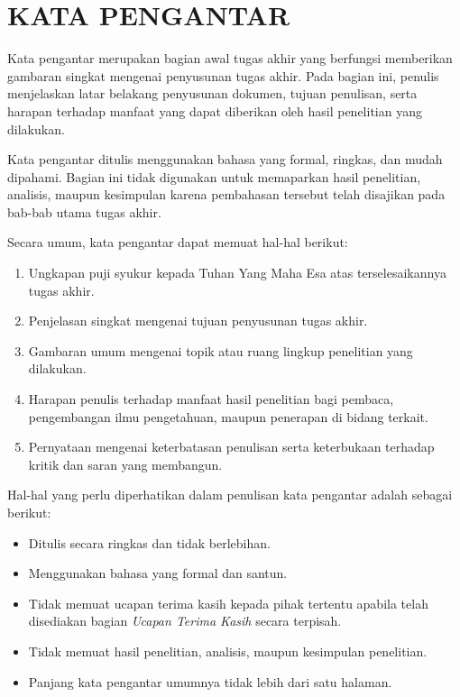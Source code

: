 
\chapter*{\MakeUppercase{Kata Pengantar}}

Kata pengantar merupakan bagian awal tugas akhir yang berfungsi memberikan gambaran singkat mengenai penyusunan tugas akhir. Pada bagian ini, penulis menjelaskan latar belakang penyusunan dokumen, tujuan penulisan, serta harapan terhadap manfaat yang dapat diberikan oleh hasil penelitian yang dilakukan.

Kata pengantar ditulis menggunakan bahasa yang formal, ringkas, dan mudah dipahami. Bagian ini tidak digunakan untuk memaparkan hasil penelitian, analisis, maupun kesimpulan karena pembahasan tersebut telah disajikan pada bab-bab utama tugas akhir.

Secara umum, kata pengantar dapat memuat hal-hal berikut:

\begin{enumerate}[topsep=0pt,itemsep=0pt,parsep=0pt,leftmargin=*]
\item Ungkapan puji syukur kepada Tuhan Yang Maha Esa atas terselesaikannya tugas akhir.
\item Penjelasan singkat mengenai tujuan penyusunan tugas akhir.
\item Gambaran umum mengenai topik atau ruang lingkup penelitian yang dilakukan.
\item Harapan penulis terhadap manfaat hasil penelitian bagi pembaca, pengembangan ilmu pengetahuan, maupun penerapan di bidang terkait.
\item Pernyataan mengenai keterbatasan penulisan serta keterbukaan terhadap kritik dan saran yang membangun.
\end{enumerate}

Hal-hal yang perlu diperhatikan dalam penulisan kata pengantar adalah sebagai berikut:

\begin{itemize}[topsep=0pt,itemsep=0pt,parsep=0pt,leftmargin=*]
\item Ditulis secara ringkas dan tidak berlebihan.
\item Menggunakan bahasa yang formal dan santun.
\item Tidak memuat ucapan terima kasih kepada pihak tertentu apabila telah disediakan bagian \textit{Ucapan Terima Kasih} secara terpisah.
\item Tidak memuat hasil penelitian, analisis, maupun kesimpulan penelitian.
\item Panjang kata pengantar umumnya tidak lebih dari satu halaman.
\end{itemize}
